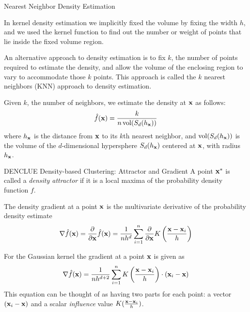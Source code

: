\begin{frame}{Nearest Neighbor Density Estimation}

  In kernel density estimation we implicitly f\/{i}xed the
volume by f\/{i}xing the width $h$, and we used the
kernel function to f\/{i}nd out the number or weight of points that lie
inside the f\/{i}xed volume region. 

\medskip
An alternative approach to density
estimation is to f\/{i}x $k$, the number of points required to estimate the
density, and allow the volume of the enclosing region to vary to
accommodate those $k$ points. This
approach is called the $k$ nearest neighbors (KNN) approach to density
estimation. 

\medskip
Given $k$, the number of neighbors, we estimate the
density at $\mathbf{x}$ as follows:
\begin{align*}
  \hf(\bx) = \frac{k}{n \vol(S_d(h_\bx))}
\end{align*}
where $h_{\mathbf{x}}$ is the distance from $\mathbf{x}$ to its $k$th nearest
neighbor, and
$\vol(S_d(h_\bx))$ is the volume of the
$d$-dimensional hypersphere $S_d(h_{\mathbf{x}})$ centered at $\mathbf{x}$,
with radius $h_{\mathbf{x}}$.
\end{frame}



\begin{frame}{DENCLUE Density-based Clustering: Attractor and Gradient}
A point $\mathbf{x}^*$ is called a {\em density attractor} if it is a
local maxima of the probability density function $f$.  

\medskip
The density gradient at a point $\mathbf{x}$ is the multivariate
derivative of the probability density estimate
\begin{align*}
    \nabla \kern3pt\hat{\kern-3pt f}(\mathbf{x}) = {\partial \over \partial \mathbf{x}} \kern3pt\hat{\kern-3pt f}(\mathbf{x}) =
     {1 \over n h^d}
     \sum_{i=1}^n {\partial \over \partial \mathbf{x}}
     K\left(\frac{\mathbf{x}-\mathbf{x}_i}{h}\right)
\end{align*}

\medskip
For the Gaussian kernel the gradient at a point $\mathbf{x}$ is given as
 \begin{align*}
     \nabla \kern3pt\hat{\kern-3pt f}(\mathbf{x})  = {1 \over n h^{d+2}} \sum_{i=1}^n
        K\left(\frac{\mathbf{x}-\mathbf{x}_i}{h}\right)\cdot (\mathbf{x}_i - \mathbf{x})
\end{align*}
This equation can be thought of as having two parts for each point: a
vector $(\mathbf{x}_i-\mathbf{x})$ and a scalar {\em influence} value
$K(\frac{\mathbf{x}-\mathbf{x}_i}{h})$.
\end{frame}



